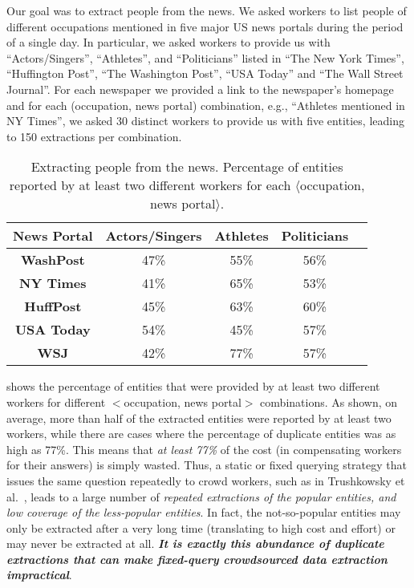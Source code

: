 \begin{example}\label{ex:people-news}
Our goal was to extract 
people from the news. 
We asked workers to list people 
of different occupations mentioned in five major US news portals during the period of a single day. In particular, we asked workers to provide us with ``Actors/Singers'', ``Athletes'', and ``Politicians'' listed in ``The New York Times'',  ``Huffington Post'', ``The Washington Post'', ``USA  Today'' and ``The Wall Street Journal''. 
For each newspaper we provided a 
link to the newspaper's homepage 
and for each (occupation, news portal) 
combination, e.g., ``Athletes mentioned in NY Times'', 
we asked 30 distinct workers to provide us with five entities, leading to 150 extractions per combination. %
\begin{table}
\vspace{-5pt}
\center
\small
\caption{Extracting people from the news. Percentage of entities reported by at least two different workers for each $\langle$occupation, news portal$\rangle$.}
\vspace{-8pt}
\label{tab:duplicates}
\begin{tabular}{|c|c|c|c|c|}
\hline
News Portal & {\bf Actors/Singer}s & {\bf Athletes} & \textbf{Politicians}\\ \hline
{\bf WashPost} & 47\% & 55\% & 56\% \\
{\bf NY Times} & 41\%& 65\% & 53\% \\
{\bf HuffPost} & 45\% & 63\% & 60\% \\
{\bf USA Today} & 54\% & 45\% & 57\% \\
{\bf WSJ} & 42\% & 77\% & 57\% \\
\hline
\end{tabular}
\vspace{-5pt}
\end{table}

 shows the percentage of entities that were provided by at least two different workers for different $<$occupation, news portal$>$ combinations. As shown, on average, more than half of the extracted entities were reported by at least two workers, while there are cases where the percentage of duplicate entities was as high as 77\%. This means that {\em at least 77\%} of the cost (in compensating workers for their answers) is simply wasted. Thus, a static or fixed 
querying strategy that issues the same question repeatedly to crowd workers,
such as in Trushkowsky et al.~\cite{trushkowsky:2013}, 
leads to a large number of {\em repeated extractions of the popular entities, and low coverage of the less-popular entities}. In fact, the not-so-popular entities may only be extracted after a very long time (translating to high cost and effort) or may never be extracted at all. {\bf \em It is exactly this abundance of duplicate extractions that can make fixed-query crowdsourced data extraction impractical}.
\end{example}


